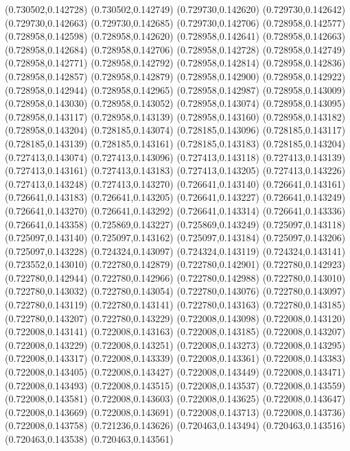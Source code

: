 (0.730502,0.142728)
(0.730502,0.142749)
(0.729730,0.142620)
(0.729730,0.142642)
(0.729730,0.142663)
(0.729730,0.142685)
(0.729730,0.142706)
(0.728958,0.142577)
(0.728958,0.142598)
(0.728958,0.142620)
(0.728958,0.142641)
(0.728958,0.142663)
(0.728958,0.142684)
(0.728958,0.142706)
(0.728958,0.142728)
(0.728958,0.142749)
(0.728958,0.142771)
(0.728958,0.142792)
(0.728958,0.142814)
(0.728958,0.142836)
(0.728958,0.142857)
(0.728958,0.142879)
(0.728958,0.142900)
(0.728958,0.142922)
(0.728958,0.142944)
(0.728958,0.142965)
(0.728958,0.142987)
(0.728958,0.143009)
(0.728958,0.143030)
(0.728958,0.143052)
(0.728958,0.143074)
(0.728958,0.143095)
(0.728958,0.143117)
(0.728958,0.143139)
(0.728958,0.143160)
(0.728958,0.143182)
(0.728958,0.143204)
(0.728185,0.143074)
(0.728185,0.143096)
(0.728185,0.143117)
(0.728185,0.143139)
(0.728185,0.143161)
(0.728185,0.143183)
(0.728185,0.143204)
(0.727413,0.143074)
(0.727413,0.143096)
(0.727413,0.143118)
(0.727413,0.143139)
(0.727413,0.143161)
(0.727413,0.143183)
(0.727413,0.143205)
(0.727413,0.143226)
(0.727413,0.143248)
(0.727413,0.143270)
(0.726641,0.143140)
(0.726641,0.143161)
(0.726641,0.143183)
(0.726641,0.143205)
(0.726641,0.143227)
(0.726641,0.143249)
(0.726641,0.143270)
(0.726641,0.143292)
(0.726641,0.143314)
(0.726641,0.143336)
(0.726641,0.143358)
(0.725869,0.143227)
(0.725869,0.143249)
(0.725097,0.143118)
(0.725097,0.143140)
(0.725097,0.143162)
(0.725097,0.143184)
(0.725097,0.143206)
(0.725097,0.143228)
(0.724324,0.143097)
(0.724324,0.143119)
(0.724324,0.143141)
(0.723552,0.143010)
(0.722780,0.142879)
(0.722780,0.142901)
(0.722780,0.142923)
(0.722780,0.142944)
(0.722780,0.142966)
(0.722780,0.142988)
(0.722780,0.143010)
(0.722780,0.143032)
(0.722780,0.143054)
(0.722780,0.143076)
(0.722780,0.143097)
(0.722780,0.143119)
(0.722780,0.143141)
(0.722780,0.143163)
(0.722780,0.143185)
(0.722780,0.143207)
(0.722780,0.143229)
(0.722008,0.143098)
(0.722008,0.143120)
(0.722008,0.143141)
(0.722008,0.143163)
(0.722008,0.143185)
(0.722008,0.143207)
(0.722008,0.143229)
(0.722008,0.143251)
(0.722008,0.143273)
(0.722008,0.143295)
(0.722008,0.143317)
(0.722008,0.143339)
(0.722008,0.143361)
(0.722008,0.143383)
(0.722008,0.143405)
(0.722008,0.143427)
(0.722008,0.143449)
(0.722008,0.143471)
(0.722008,0.143493)
(0.722008,0.143515)
(0.722008,0.143537)
(0.722008,0.143559)
(0.722008,0.143581)
(0.722008,0.143603)
(0.722008,0.143625)
(0.722008,0.143647)
(0.722008,0.143669)
(0.722008,0.143691)
(0.722008,0.143713)
(0.722008,0.143736)
(0.722008,0.143758)
(0.721236,0.143626)
(0.720463,0.143494)
(0.720463,0.143516)
(0.720463,0.143538)
(0.720463,0.143561)
